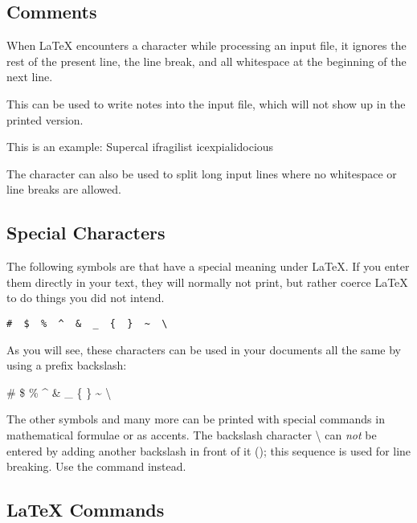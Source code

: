 \subsection{Comments}

When \LaTeX{} encounters a \ai{\%} character while processing an input file,
it ignores the rest of the present line, the line break, and all
whitespace at the beginning of the next line.

This can be used to write notes into the input file, which will not show up
in the printed version.

\begin{example}
This is an %
example: Supercal%
              ifragilist%
    icexpialidocious
\end{example}

The \ai{\%} character can also be used to split long input lines where no
whitespace or line breaks are allowed.

\subsection{Special Characters}

The following symbols are  that have a special meaning
under \LaTeX{}. If you enter them directly in your text, they will normally not
print, but rather coerce \LaTeX{} to do things you did not intend.
\begin{code}
\verb.#  $  %  ^  &  _  {  }  ~  \ . %
\end{code}

As you will see, these characters can be used in your documents all
the same by using a prefix backslash:

\begin{example}
\# \$ \% \^{} \& \_ \{ \} \~{}
\textbackslash{}
\end{example}

The other symbols and many more can be printed with special commands
in mathematical formulae or as accents. The backslash character
\textbackslash{} can \emph{not} be entered by adding another backslash
in front of it (\csi{\bs}); this sequence is used for
line breaking. Use the  command instead.

\subsection{\LaTeX{} Commands}

